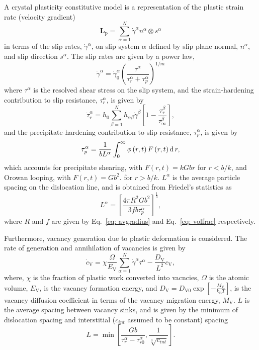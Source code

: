 \documentclass[11pt]{scrartcl}
\newcommand{\eref}[1]{Eq.~\eqref{#1}}
\newcommand{\kB}{\ensuremath{k_\text{B}}}
\newcommand{\tnsr}[1]{\ensuremath{\mathbf{#1}}}
\newcommand{\inc}[1]{\ensuremath{\text d\,{#1}}}
\newcommand{\Lp}[1][]{\ensuremath{\tnsr L_\text{p#1}}}
\begin{document}
A crystal plasticity constitutive model is a representation of the plastic strain rate (velocity gradient)
%
\begin{equation}
\label{eq: lp}
\Lp = \sum_{\alpha = 1}^{N} \dot{\gamma}^{\alpha} n^{\alpha} \otimes s^{\alpha} 
\end{equation}
%
in terms of the slip rates, $\dot{\gamma}^{\alpha}$, on slip system $\alpha$ defined by slip plane normal, $n^{\alpha}$, and slip direction $s^{\alpha}$.
The slip rates are given by a power law,
%
\begin{equation}
\label{eq: sliprate}
\dot{\gamma}^{\alpha} = \dot{\gamma}_0^{\alpha} \left(\frac{\tau^{\alpha}}{\tau_r^{\alpha} + \tau_p^{\alpha}}\right)^{1/m}
\end{equation}
%
where $\tau^{\alpha}$ is the resolved shear stress on the slip system, and the strain-hardening contribution to slip resistance, $\tau_r^{\alpha}$, is given by
%
\begin{equation}
\label{eq: strainhardening}
\dot{\tau}_r^{\alpha} = h_0 \sum_{\beta = 1}^{N} h_{\alpha\beta}\dot{\gamma}^{\beta}\left[1 - \frac{\tau_r^{\beta}}{\tau_{\infty}^{\beta}}\right],
\end{equation}
%
and the precipitate-hardening contribution to slip resistance, $\tau_p^{\alpha}$, is given by
%
\begin{equation}
\label{eq: precipitatehardening}
\tau_p^{\alpha} = \frac{1}{b L^{\alpha}} \int_{0}^{\infty} \phi\left(r,t\right) F\left(r,t\right) \inc{r},
\end{equation}
%
which accounts for precipitate shearing, with $F\left(r,t\right) = k G b r$ for $r < b/k$, and Orowan looping, with $F\left(r,t\right) = G b^2$.  for $r > b/k$. $L^{\alpha}$ is the average particle spacing on the dislocation line, and is obtained from Friedel's statistics as
%
\begin{equation}
\label{eq: friedel}
L^{\alpha} = \left[\frac{4 \pi R^2 G b^2}{3 f b \tau_p^{\alpha}} \right]^{\frac{1}{3}},
\end{equation}
%
where $R$ and $f$ are given by \eref{eq: avgradius} and \eref{eq: volfrac} respectively.

Furthermore, vacancy generation due to plastic deformation is considered. The rate of generation and annihilation of vacancies is given by
%
\begin{equation}
\label{eq: vacancyrate}
\dot{c}_\text{V} = \chi \frac{\Omega}{E_\text{V}} \sum_{\alpha = 1}^{N} \dot{\gamma}^{\alpha} \tau^{\alpha} - \frac{D_\text{V}}{L^2} c_\text{V},
\end{equation} 
%
where, $\chi$ is the fraction of plastic work converted into vacncies, $\Omega$ is the atomic volume, $E_\text{V}$, is the vacancy formation energy, and $D_\text{V} = D_\text{V0} \exp\left[-\frac{M_\text{V}}{\kB T}\right]$, is the vacancy diffusion coefficient in terms of the vacancy migration energy, $M_\text{V}$. 
$L$ is the average spacing between vacancy sinks, and is given by the minimum of dislocation spacing and interstitial ($c_{int}$ assumed to be constant) spacing
%
\begin{equation}
\label{eq: vacancysink}
L = \min\left[\frac{G b}{\tau_r^{\alpha} - \tau_{r0}^{\alpha}}, \frac{1}{\sqrt[3]{c_{int}}}\right].
\end{equation} 
%
\end{document}
